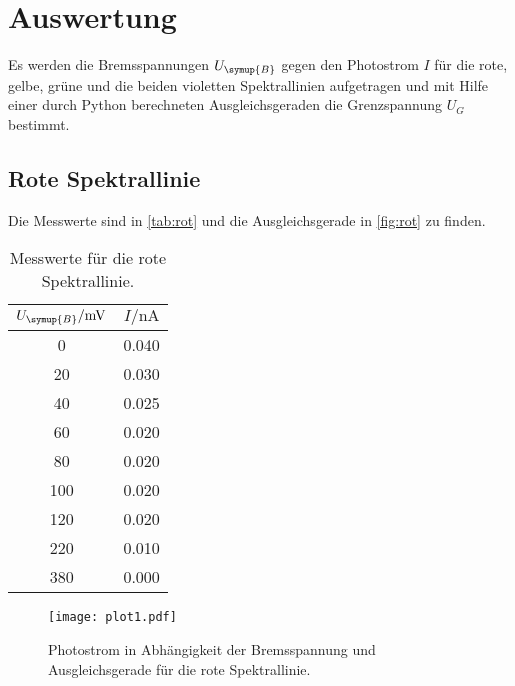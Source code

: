 \section{Auswertung}
\label{sec:Auswertung}
Es werden die Bremsspannungen $U_{\symup{B}}$ gegen den Photostrom $I$ für die rote, gelbe, grüne
und die beiden violetten Spektrallinien aufgetragen und mit Hilfe einer durch Python berechneten
Ausgleichsgeraden die Grenzspannung $U_G$ bestimmt.

\subsection{Rote Spektrallinie}
\label{sec:rote_Spektrallinie}
Die Messwerte sind in \autoref{tab:rot} und die Ausgleichsgerade in \autoref{fig:rot} zu finden.
\begin{table}
    \centering
    \caption{Messwerte für die rote Spektrallinie.}
    \label{tab:rot}
    \begin{tabular}{c c}
        \toprule
        $U_{\symup{B}} / \unit{\milli\volt}$ & $I / \unit{\nano\ampere}$ \\
        \midrule
          0 & 0.040 \\
         20 & 0.030 \\
         40 & 0.025 \\
         60 & 0.020 \\
         80 & 0.020 \\
        100 & 0.020 \\
        120 & 0.020 \\
        220 & 0.010 \\
        380 & 0.000 \\
        \bottomrule
    \end{tabular}
\end{table}

\begin{figure}
    \centering
    \label{fig:rot}
    \caption{Photostrom in Abhängigkeit der Bremsspannung und Ausgleichsgerade für die rote Spektrallinie.}
    \texttt{[image: plot1.pdf]}
\end{figure}

